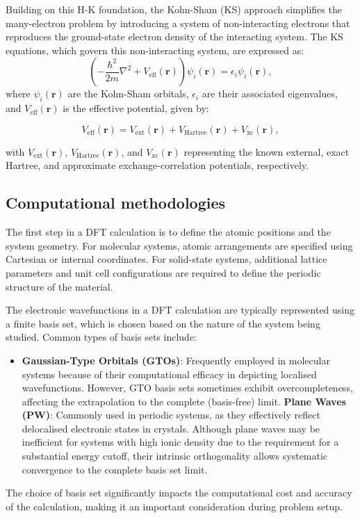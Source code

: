 Building on this H-K foundation, the Kohn-Sham (KS) approach simplifies the many-electron problem by introducing a system of non-interacting electrons that reproduces the ground-state electron density of the interacting system.
The KS equations, which govern this non-interacting system, are expressed as:
\begin{equation}
\label{equ:2.26}
\left(-\frac{\hbar^2}{2m} \nabla^2 + V_{\text{eff}}(\mathbf{r})\right) \psi_i(\mathbf{r}) = \epsilon_i \psi_i(\mathbf{r}),
\end{equation}
where $\psi_i(\mathbf{r})$ are the Kohn-Sham orbitals, $\epsilon_i$ are their associated eigenvalues, and $V_{\text{eff}}(\mathbf{r})$ is the effective potential, given by:

\begin{equation}
\label{equ:2.27}
V_{\text{eff}}(\mathbf{r}) = V_{\text{ext}}(\mathbf{r}) + V_{\text{Hartree}}(\mathbf{r}) + V_{\text{xc}}(\mathbf{r}),
\end{equation}

with $V_{\text{ext}}(\mathbf{r})$, $V_{\text{Hartree}}(\mathbf{r})$, and $V_{\text{xc}}(\mathbf{r})$ representing the known external, exact Hartree, and approximate exchange-correlation potentials, respectively.

\subsection{Computational methodologies} \label{sec:2.2.2}
The first step in a DFT calculation is to define the atomic positions and the system geometry.
For molecular systems, atomic arrangements are specified using Cartesian or internal coordinates.
For solid-state systems, additional lattice parameters and unit cell configurations are required to define the periodic structure of the material.
 
The electronic wavefunctions in a DFT calculation are typically represented using a finite basis set, which is chosen based on the nature of the system being studied.
Common types of basis sets include:
\begin{itemize}
    \item[1] \textbf{Gaussian-Type Orbitals (GTOs)}:  Frequently employed in molecular systems because of their computational efficacy in depicting localised wavefunctions.  However, GTO basis sets sometimes exhibit overcompleteness, affecting the extrapolation to the complete (basis-free) limit.
    \textbf{Plane Waves (PW)}:  Commonly used in periodic systems, as they effectively reflect delocalised electronic states in crystals.  Although plane waves may be inefficient for systems with high ionic density due to the requirement for a substantial energy cutoff, their intrinsic orthogonality allows systematic convergence to the complete basis set limit.
\end{itemize}
The choice of basis set significantly impacts the computational cost and accuracy of the calculation, making it an important consideration during problem setup.

